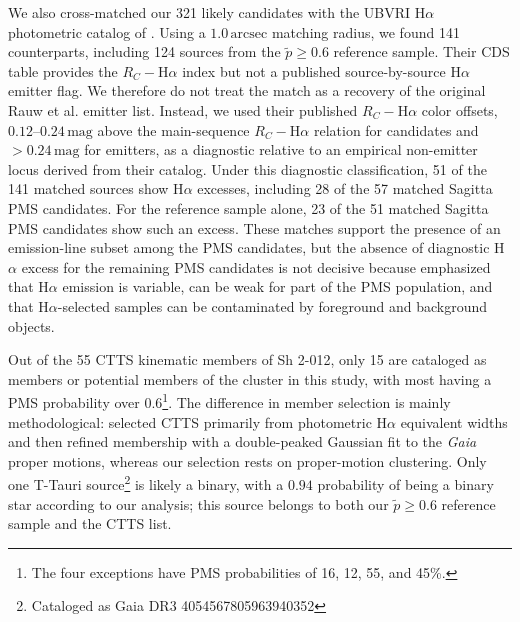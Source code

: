 \documentclass{aa}
\begin{document}
We also cross-matched our 321 likely candidates with the UBVRI H$\alpha$ photometric catalog of \citet{2010AA...511A..25R}. Using a $1.0\,\mathrm{arcsec}$ matching radius, we found 141 counterparts, including 124 sources from the $\tilde{p}\geq0.6$ reference sample. Their CDS table provides the $R_C-$H$\alpha$ index but not a published source-by-source H$\alpha$ emitter flag. We therefore do not treat the match as a recovery of the original Rauw et al. emitter list. Instead, we used their published $R_C-$H$\alpha$ color offsets, $0.12$--$0.24\,\mathrm{mag}$ above the main-sequence $R_C-$H$\alpha$ relation for candidates and $>0.24\,\mathrm{mag}$ for emitters, as a diagnostic relative to an empirical non-emitter locus derived from their catalog. Under this diagnostic classification, 51 of the 141 matched sources show H$\alpha$ excesses, including 28 of the 57 matched Sagitta PMS candidates. For the reference sample alone, 23 of the 51 matched Sagitta PMS candidates show such an excess. These matches support the presence of an emission-line subset among the PMS candidates, but the absence of diagnostic H$\alpha$ excess for the remaining PMS candidates is not decisive because \citet{2010AA...511A..25R} emphasized that H$\alpha$ emission is variable, can be weak for part of the PMS population, and that H$\alpha$-selected samples can be contaminated by foreground and background objects.

Out of the 55 CTTS kinematic members of Sh 2-012, only 15 are cataloged as members or potential members of the cluster in this study, with most having a PMS probability over $0.6$\footnote{The four exceptions have PMS probabilities of 16, 12, 55, and 45\%.}. The difference in member selection is mainly methodological: \citet{2019MNRAS.484.5102K} selected CTTS primarily from photometric H$\alpha$ equivalent widths and then refined membership with a double-peaked Gaussian fit to the \textit{Gaia} proper motions, whereas our selection rests on proper-motion clustering. Only one T-Tauri source\footnote{Cataloged as Gaia DR3 4054567805963940352} is likely a binary, with a $0.94$ probability of being a binary star according to our analysis; this source belongs to both our $\tilde{p}\geq0.6$ reference sample and the \citet{2019MNRAS.484.5102K} CTTS list.
\end{document}
